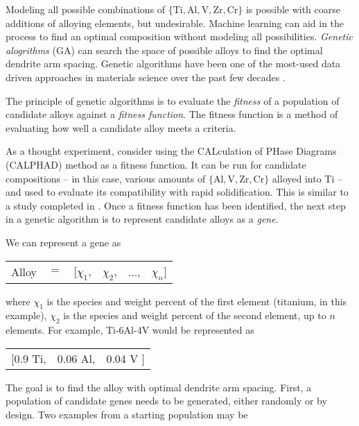 Modeling all possible combinations of $\{\text{Ti},\text{Al}, \text{V}, \text{Zr}, \text{Cr}\}$ is possible with coarse additions of alloying elements, but undesirable. Machine learning can aid in the process to find an optimal composition without modeling all possibilities. \textit{Genetic alogrithms} (GA) can search the space of possible alloys to find the optimal dendrite arm spacing. Genetic algorithms have been one of the most-used data driven approaches in materials science over the past few decades \cite{Morris1996, Ho1998, Wolf2000, Johannesson2002, Stucke2003, Hart2005, Oganov2006}.

The principle of genetic algorithms is to evaluate the \textit{fitness} of a population of candidate alloys against a \textit{fitness function}. The fitness function is a method of evaluating how well a candidate alloy meets a criteria.

As a thought experiment, consider using the CALculation of PHase Diagrams (CALPHAD) method as a fitness function. It can be run for candidate compositions -- in this case, various amounts of $\{\text{Al}, \text{V}, \text{Zr}, \text{Cr}\}$ alloyed into Ti -- and used to evaluate its compatibility with rapid solidification. This is similar to a study completed in \cite{Li2017}. Once a fitness function has been identified, the next step in a genetic algorithm is to represent candidate alloys as a \textit{gene}. 

We can represent a gene as \\

\begin{table}[h!]
\begin{tabular}{cccccc}
	Alloy & $=$ & [$\chi_1$, & $\chi_2$, & $\ldots$, & $\chi_n$] \\
\end{tabular}
\end{table}
where $\chi_1$ is the species and weight percent of the first element (titanium, in this example), $\chi_2$ is the species and weight percent of the second element, up to $n$ elements. For example, Ti-6Al-4V would be represented as \\

\begin{table}[h!]
\begin{tabular}{ccc}
	 [0.9 Ti,  & 0.06 Al, & 0.04 V ] \\
\end{tabular}
\end{table}
The goal is to find the alloy with optimal dendrite arm spacing. First, a population of candidate genes needs to be generated, either randomly or by design. Two examples from a starting population may be \\

